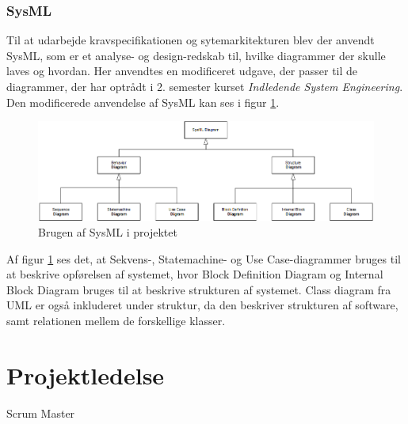 \documentclass[a4paper,12pt,fleqn,oneside]{article}
\begin{document}
\subsubsection{SysML}
Til at udarbejde kravspecifikationen og sytemarkitekturen blev der anvendt SysML, som er et analyse- og design-redskab til, hvilke diagrammer der skulle laves og hvordan. Her anvendtes en modificeret udgave, der passer til de diagrammer, der har optrådt i 2. semester kurset \textit{Indledende System Engineering}. Den modificerede anvendelse af SysML kan ses i figur \ref{fig:Sysml_usage}.
\begin{figure}[H]
    \centering
    \includegraphics[width=\textwidth]{Processdokument/graphics/Sysml_usage.png}
    \caption{Brugen af SysML i projektet}
    \label{fig:Sysml_usage}
\end{figure}

Af figur \ref{fig:Sysml_usage} ses det, at Sekvens-, Statemachine- og Use Case-diagrammer bruges til at beskrive opførelsen af systemet, hvor Block Definition Diagram og Internal Block Diagram bruges til at beskrive strukturen af systemet. Class diagram fra UML er også inkluderet under struktur, da den beskriver strukturen af software, samt relationen mellem de forskellige klasser. 


\section{Projektledelse}
Scrum Master
\end{document}
